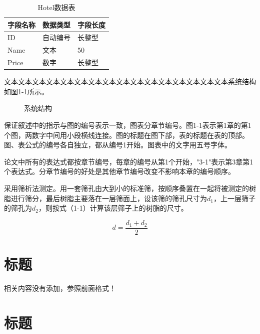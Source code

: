 \documentclass{suse-cs-thesis}
\begin{document}
\begin{table}[htbp]
    \centering
    \caption{Hotel数据表}
    \label{tab:hotel}
    \begin{tabular}{lll}
        \toprule
        字段名称 & 数据类型 & 字段长度 \\
        \midrule
        ID & 自动编号 & 长整型 \\
        Name & 文本 & 50 \\
        Price & 数字 & 长整型 \\
        \bottomrule
    \end{tabular}
\end{table}

文本文本文本文本文本文本文本文本文本文本文本文本文本文本文本文本系统结构如图1-1所示。

\begin{figure}[htbp]
    \centering
    \caption{系统结构}
    \label{fig:structure}
\end{figure}

保证叙述中的指示与图的编号表示一致，图表分章节编号。图1-1表示第1章的第1个图，两数字中间用小段横线连接。图的标题在图下部，表的标题在表的顶部。图、表公式的编号各自独立，都从编号1开始。图表中的文字用五号字体。

论文中所有的表达式都按章节编号，每章的编号从第1个开始，"3-1"表示第3章第1个表达式。分章节编号的好处是其他章节编号改变不影响本章的编号顺序。

采用筛析法测定。用一套筛孔由大到小的标准筛，按顺序叠置在一起将被测定的树脂进行筛分，最后树脂主要落在一层筛面上，设该筛的筛孔尺寸为$d_1$，上一层筛子的筛孔为$d_2$，则按式（1-1）计算该层筛子上的树脂的尺寸。

\begin{equation}
    d = \frac{d_1 + d_2}{2}
    \label{eq:resin}
\end{equation}

\chapter{标题}

相关内容没有添加，参照前面格式！

\chapter{标题}
\end{document}
